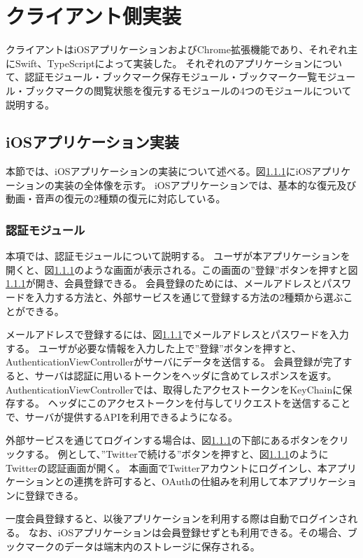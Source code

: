 \section{クライアント側実装}
クライアントはiOSアプリケーションおよびChrome拡張機能であり、それぞれ主にSwift、TypeScriptによって実装した。
それぞれのアプリケーションについて、認証モジュール・ブックマーク保存モジュール・ブックマーク一覧モジュール・ブックマークの閲覧状態を復元するモジュールの4つのモジュールについて説明する。

\subsection{iOSアプリケーション実装}
本節では、iOSアプリケーションの実装について述べる。図\ref{}にiOSアプリケーションの実装の全体像を示す。
iOSアプリケーションでは、基本的な復元及び動画・音声の復元の2種類の復元に対応している。

\subsubsection{認証モジュール}
本項では、認証モジュールについて説明する。
ユーザが本アプリケーションを開くと、図\ref{}のような画面が表示される。この画面の”登録”ボタンを押すと図\ref{}が開き、会員登録できる。
会員登録のためには、メールアドレスとパスワードを入力する方法と、外部サービスを通じて登録する方法の2種類から選ぶことができる。

メールアドレスで登録するには、図\ref{}でメールアドレスとパスワードを入力する。
ユーザが必要な情報を入力した上で”登録”ボタンを押すと、AuthenticationViewControllerがサーバにデータを送信する。
会員登録が完了すると、サーバは認証に用いるトークンをヘッダに含めてレスポンスを返す。
AuthenticationViewControllerでは、取得したアクセストークンをKeyChain\cite{}に保存する。
ヘッダにこのアクセストークンを付与してリクエストを送信することで、サーバが提供するAPIを利用できるようになる。

外部サービスを通じてログインする場合は、図\ref{}の下部にあるボタンをクリックする。
例として、”Twitterで続ける”ボタンを押すと、図\ref{}のようにTwitter\cite{}の認証画面が開く。
本画面でTwitterアカウントにログインし、本アプリケーションとの連携を許可すると、OAuthの仕組みを利用して本アプリケーションに登録できる。

一度会員登録すると、以後アプリケーションを利用する際は自動でログインされる。
なお、iOSアプリケーションは会員登録せずとも利用できる。その場合、ブックマークのデータは端末内のストレージに保存される。

